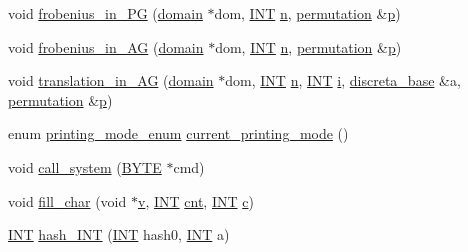 \begin{DoxyCompactItemize}
\item 
void \mbox{\hyperlink{global_8_c_ab7960431548a3d41bc600a8fa22a7e52}{frobenius\+\_\+in\+\_\+\+PG}} (\mbox{\hyperlink{classdomain}{domain}} $\ast$dom, \mbox{\hyperlink{galois_8h_a09fddde158a3a20bd2dcadb609de11dc}{I\+NT}} \mbox{\hyperlink{simeon_8_c_a7f2cd26777ce0ff3fdaf8d02aacbddfb}{n}}, \mbox{\hyperlink{classpermutation}{permutation}} \&\mbox{\hyperlink{alphabet2_8_c_a533391314665d6bf1b5575e9a9cd8552}{p}})
\item 
void \mbox{\hyperlink{global_8_c_a88ab414b01bb677c3814503be20c7e43}{frobenius\+\_\+in\+\_\+\+AG}} (\mbox{\hyperlink{classdomain}{domain}} $\ast$dom, \mbox{\hyperlink{galois_8h_a09fddde158a3a20bd2dcadb609de11dc}{I\+NT}} \mbox{\hyperlink{simeon_8_c_a7f2cd26777ce0ff3fdaf8d02aacbddfb}{n}}, \mbox{\hyperlink{classpermutation}{permutation}} \&\mbox{\hyperlink{alphabet2_8_c_a533391314665d6bf1b5575e9a9cd8552}{p}})
\item 
void \mbox{\hyperlink{global_8_c_ac805a17cf57e334b24457fab41a7da4d}{translation\+\_\+in\+\_\+\+AG}} (\mbox{\hyperlink{classdomain}{domain}} $\ast$dom, \mbox{\hyperlink{galois_8h_a09fddde158a3a20bd2dcadb609de11dc}{I\+NT}} \mbox{\hyperlink{simeon_8_c_a7f2cd26777ce0ff3fdaf8d02aacbddfb}{n}}, \mbox{\hyperlink{galois_8h_a09fddde158a3a20bd2dcadb609de11dc}{I\+NT}} \mbox{\hyperlink{alphabet2_8_c_acb559820d9ca11295b4500f179ef6392}{i}}, \mbox{\hyperlink{classdiscreta__base}{discreta\+\_\+base}} \&a, \mbox{\hyperlink{classpermutation}{permutation}} \&\mbox{\hyperlink{alphabet2_8_c_a533391314665d6bf1b5575e9a9cd8552}{p}})
\item 
enum \mbox{\hyperlink{discreta_8h_abd5a972aa69cb9eb5e94093a5ab1bf86}{printing\+\_\+mode\+\_\+enum}} \mbox{\hyperlink{global_8_c_afcd81bfedce13a2f5f14361608e763f2}{current\+\_\+printing\+\_\+mode}} ()
\item 
void \mbox{\hyperlink{global_8_c_a11294156aedd7726f626da3726fee784}{call\+\_\+system}} (\mbox{\hyperlink{galois_8h_ab6cc7b4aeb6ea31aba2b3fbfc83ff5e6}{B\+Y\+TE}} $\ast$cmd)
\item 
void \mbox{\hyperlink{global_8_c_a0429f5462bfcfd509d83bc1f7ebfc818}{fill\+\_\+char}} (void $\ast$\mbox{\hyperlink{simeon_8_c_aeb3f3030944801b163bc3b829a7f6710}{v}}, \mbox{\hyperlink{galois_8h_a09fddde158a3a20bd2dcadb609de11dc}{I\+NT}} \mbox{\hyperlink{subsets_8_c_a9cfbb269728dc4185236d28be58d9eab}{cnt}}, \mbox{\hyperlink{galois_8h_a09fddde158a3a20bd2dcadb609de11dc}{I\+NT}} \mbox{\hyperlink{alphabet2_8_c_a4e1e0e72dd773439e333c84dd762a9c3}{c}})
\item 
\mbox{\hyperlink{galois_8h_a09fddde158a3a20bd2dcadb609de11dc}{I\+NT}} \mbox{\hyperlink{global_8_c_a5bcfc62557daf60e1d841ca1fcffda03}{hash\+\_\+\+I\+NT}} (\mbox{\hyperlink{galois_8h_a09fddde158a3a20bd2dcadb609de11dc}{I\+NT}} hash0, \mbox{\hyperlink{galois_8h_a09fddde158a3a20bd2dcadb609de11dc}{I\+NT}} a)

\end{DoxyCompactItemize}
